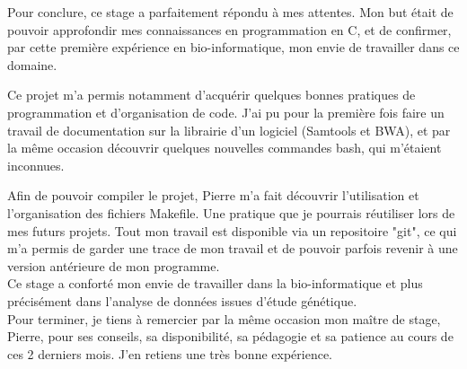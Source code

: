 \documentclass[a4paper,12pt]{article}
\begin{document}
Pour conclure, ce stage a parfaitement répondu à mes attentes. Mon but était de pouvoir approfondir mes connaissances en programmation en C, et de confirmer, par cette première expérience en bio-informatique, mon envie de travailler dans ce domaine. 

Ce projet m'a permis notamment d'acquérir quelques bonnes pratiques de programmation et d'organisation de code. J'ai pu pour la première fois faire un travail de documentation sur la librairie d'un logiciel (Samtools et BWA), et par la même occasion découvrir quelques nouvelles commandes bash, qui m'étaient inconnues.  

Afin de pouvoir compiler le projet, Pierre m'a fait découvrir l'utilisation et l'organisation des fichiers Makefile. Une pratique que je pourrais réutiliser lors de mes futurs projets. Tout mon travail est disponible via un repositoire "git", ce qui m'a permis de garder une trace de mon travail et de pouvoir parfois revenir à une version antérieure de mon programme. \\
 
Ce stage a conforté mon envie de travailler dans la bio-informatique et plus précisément dans l'analyse de données issues d'étude génétique. \\
 
Pour terminer, je tiens à remercier par la même occasion mon maître de stage, Pierre, pour ses conseils, sa disponibilité, sa pédagogie et sa patience au cours de ces 2 derniers mois. J'en retiens une très bonne expérience.

\clearpage


\end{document}
